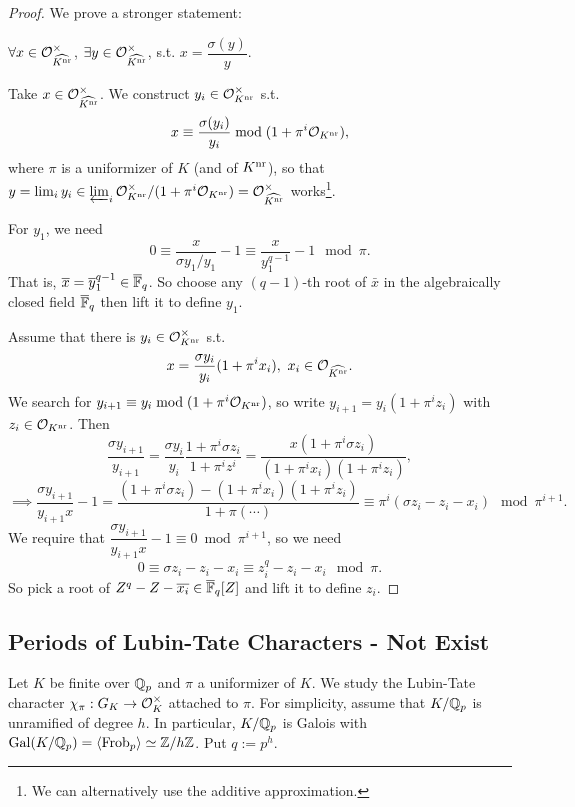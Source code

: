 \begin{proof}
    We prove a stronger statement: \begin{center}
        $\forall x\in\mathcal{O}_{\widehat{K^{\mathrm{nr}}}}^\times$, $\exists y\in \mathcal{O}_{\widehat{K^{\mathrm{nr}}}}^\times$, s.t. $x = \dfrac{\sigma(y)}{y}$.
    \end{center}\par
    Take $x\in\mathcal{O}_{\widehat{K^{\mathrm{nr}}}}^\times$.
    We construct $y_i\in\mathcal{O}_{K^{\mathrm{nr}}}^\times$ s.t. \[x \equiv {\sigma(y_i)\over y_i}\bmod (1 + \pi^{i}\mathcal{O}_{K^{\mathrm{nr}}}),\] where $\pi$ is a uniformizer of $K$ (and of $K^{\mathrm{nr}}$),
    so that $y = \lim_i y_i\in
    \varprojlim_{i}\mathcal{O}_{K^{\mathrm{nr}}}^\times/(1 + \pi^i\mathcal{O}_{K^{\mathrm{nr}}})
    = \mathcal{O}_{\widehat{K^{\mathrm{nr}}}}^\times $ works\footnote{
        We can alternatively use the additive approximation.
    }.\par
    For $y_1$,
    we need \[0\equiv \frac{x}{\sigma y_1 / y_1}-1
    \equiv \frac{x}{y_1^{q-1}} - 1\mod \pi.\]
    That is, $\overline{x} = \overline{y}_1^{q-1}\in\overline{\mathbb{F}}_q$. So choose any $(q-1)$-th root of $\bar{x}$ in the algebraically closed field $\overline{\mathbb{F}}_q$ then lift it to define $y_1$.\par
    Assume that there is $y_i\in\mathcal{O}_{K^{\mathrm{nr}}}^\times$ s.t. \[x = \frac{\sigma y_i}{y_i }(1 + \pi^i x_i),\ x_i\in \O_{\widehat{K^\nr}}.\]
    We search for $y_{i+1} \equiv y_i\bmod(1 + \pi^i\mathcal{O}_{K^{\mathrm{nr}}})$,
    so write $y_{i+1} = y_i(1 + \pi^iz_i)$ with $z_i\in\mathcal{O}_{K^{\mathrm{nr}}}$.
    Then \[\frac{\sigma y_{i+1}}{y_{i+1}}
    = \frac{\sigma y_i}{y_i}\frac{1 + \pi^i\sigma z_i }{1 + \pi^iz^i}
    = \frac{x(1 + \pi^i\sigma z_i)}{(1 + \pi^ix_i)(1 + \pi^iz_i)},\]
    \[\implies \frac{\sigma y_{i+1}}{y_{i+1}x} - 1 = \frac{(1 + \pi^i\sigma z_i) - (1 + \pi^ix_i)(1 + \pi^iz_i)}{1 + \pi(\cdots)}
    \equiv \pi^i(\sigma z_i - z_i - x_i)
    \mod \pi^{i+1}.\]
    We require that $\dfrac{\sigma y_{i+1}}{y_{i+1}x} - 1\equiv 0\bmod \pi^{i+1}$,
    so we need\[0\equiv \sigma z_i - z_i - x_i \equiv z_i^q - z_i - x_i\mod \pi.\]
    So pick a root of $Z^q - Z - \overline{x_i}\in\overline{\mathbb{F}}_q[Z]$ and lift it to define $z_i$.
\end{proof}

\subsection{Periods of Lubin-Tate Characters - Not Exist}
Let $K$ be finite over $\mathbb{Q}_p$ and $\pi$ a uniformizer of $K$.
We study the Lubin-Tate character $\chi_\pi : G_K\to\mathcal{O}_K^\times$ attached to $\pi$.
For simplicity, assume that $K/\mathbb{Q}_p$ is unramified of degree $h$. In particular, $K/\mathbb{Q}_p$ is Galois with $\operatorname{Gal}(K/\mathbb{Q}_p) = \left\langle \operatorname{Frob}_p \right\rangle \simeq\mathbb{Z}/h\mathbb{Z}$.
Put $q := p^h$.

